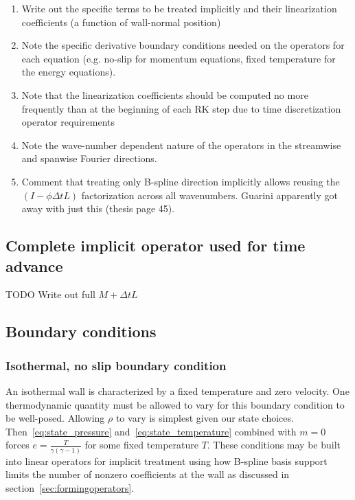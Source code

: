 \documentclass[letterpaper,11pt,nointlimits,reqno,draft]{amsart}
\begin{document}
\begin{enumerate}
\item Write out the specific terms to be treated implicitly and their linearization coefficients (a function of wall-normal position)
\item Note the specific derivative boundary conditions needed on the operators for each equation (e.g. no-slip for momentum equations, fixed temperature for the energy equations).
\item Note that the linearization coefficients should be computed no more frequently than at the beginning of each RK step due to time discretization operator requirements
\item Note the wave-number dependent nature of the operators in the streamwise and spanwise Fourier directions.
\item Comment that treating only B-spline direction implicitly allows reusing the $(I - \phi\Delta{}t L)$ factorization across all wavenumbers. Guarini apparently got away with just this (thesis page 45).
\end{enumerate}


\subsection{Complete implicit operator used for time advance}

TODO Write out full $M + \Delta{}tL$

\subsection{Boundary conditions}

\subsubsection{Isothermal, no slip boundary condition}

An isothermal wall is characterized by a fixed temperature and zero velocity.
One thermodynamic quantity must be allowed to vary for this boundary condition
to be well-posed.  Allowing $\rho$ to vary is simplest given our state choices.
Then~\eqref{eq:state_pressure} and~\eqref{eq:state_temperature} combined with
$m=0$ forces $e=\frac{T}{\gamma\left(\gamma-1\right)}$ for some fixed
temperature $T$.  These conditions may be built into linear operators for
implicit treatment using how B-spline basis support limits the number of
nonzero coefficients at the wall as discussed in
section~\ref{sec:formingoperators}.
\end{document}
